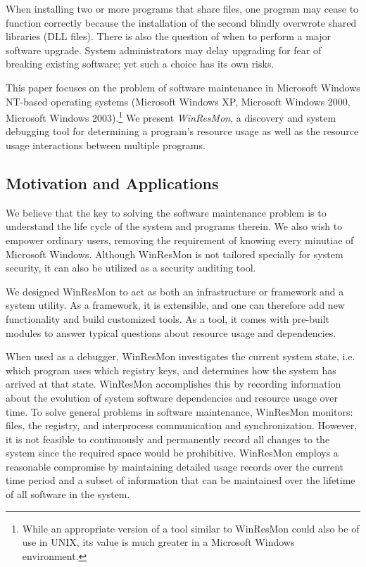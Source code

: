 When installing two or more programs that share files, one program may cease to
function correctly because the installation of the second blindly overwrote 
shared libraries (DLL files).  There is also the question of when to perform a
major software upgrade.  System administrators may delay upgrading
for fear of breaking existing software; yet such a choice has its own risks.

This paper focuses on the problem of software
maintenance in Microsoft Windows NT-based operating systems (Microsoft Windows
XP, Microsoft Windows 2000, Microsoft Windows 2003).\footnote{ While an
appropriate version of a tool similar to WinResMon could also be of use in UNIX,
its value is much greater in a Microsoft Windows environment.  } We present {\em WinResMon},
a discovery and system debugging tool for
determining a program's resource usage as well as the resource usage
interactions between multiple programs.


\subsection{Motivation and Applications}

We believe that the key to solving the software maintenance problem is to
understand the life cycle of the system and programs therein.  We also wish
to empower ordinary users, removing the requirement of knowing every minutiae
of Microsoft Windows.  Although WinResMon is not tailored specially for system
security, it can also be utilized as a security auditing tool.

We designed WinResMon to act as both an infrastructure or framework
and a system utility.  
As a framework, it is extensible, and one can therefore add
new functionality and build customized tools.  As a tool, it comes with
pre-built modules to answer typical questions about resource usage and
dependencies.

When used as a debugger, WinResMon investigates the current system state,
i.e. which program uses which registry keys, and determines how the system has
arrived at that state.  WinResMon accomplishes this by recording information
about the evolution of system software dependencies and resource usage over
time.  To solve general problems in software maintenance, WinResMon monitors:
files, the registry, and interprocess communication and synchronization.
However, it is not feasible to continuously and permanently record all changes
to the system since the required space would be prohibitive.  
WinResMon employs
a reasonable compromise by maintaining detailed usage records 
over the current time period and a
subset of information that can be maintained over the lifetime 
of all software in the system.

